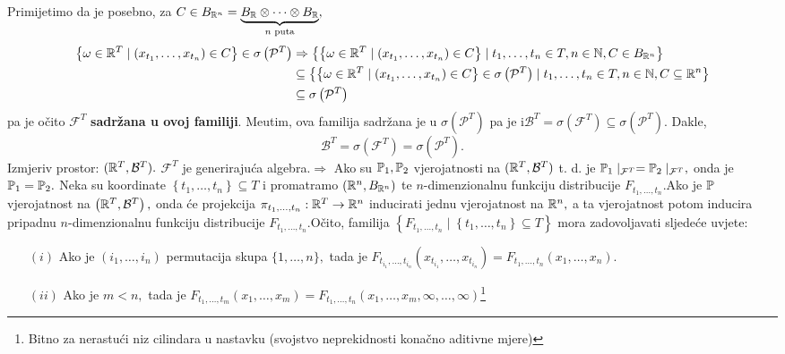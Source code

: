 \documentclass{article}
\begin{document}
Primijetimo da je posebno, za \(C\in B_{\Bbb R^n}=\underbrace{B_{\Bbb R}\otimes\cdots\otimes B_{\Bbb R}}_{n\text{ puta}},\)\[\begin{aligned}\left\{\omega\in\Bbb R^T\mid (x_{t_1},\ldots,x_{t_n})\in C\right\}\in\sigma\left(\mathcal P^T\right)&\Rightarrow\left\{\left\{\omega\in\Bbb R^T\mid(x_{t_1},\ldots,x_{t_n})\in C\right\}\mid t_1,\ldots,t_n\in T,n\in\Bbb N,C\in B_{\Bbb R^n}\right\}\\&\subseteq\left\{\left\{\omega\in\Bbb R^T\mid(x_{t_1},\ldots,x_{t_n})\in C\right\}\in\sigma\left(\mathcal P^T\right)\mid t_1,\ldots,t_n\in T,n\in\Bbb N,C\subseteq\Bbb R^n\right\}\\&\subseteq\sigma\left(\mathcal P^T\right)\end{aligned}\] pa je očito \(\mathcal F^T\) \textbf{sadržana u ovoj familiji}. Me\dj{}utim, ova familija sadržana je u \(\sigma(\mathcal P^T)\) pa je i\newline \(\mathcal B^T=\sigma\left(\mathcal F^T\right)\subseteq\sigma\left(\mathcal P^T\right).\) Dakle, \[\mathcal B^T=\sigma\left(\mathcal F^T\right)=\sigma\left(\mathcal P^T\right).\]
Izmjeriv prostor: \((\Bbb R^T,\mathcal B^T).\) \(\mathcal F^T\) je generirajuća algebra.\newline \(\Rightarrow\) Ako su \(\Bbb P_1,\Bbb P_2\) vjerojatnosti na \((\Bbb R^T,\mathcal B^T)\) t. d. je \(\Bbb P_1\mid_{\mathcal F^T}=\Bbb P_2\mid_{\mathcal F^T},\) onda je \(\Bbb P_1=\Bbb P_2.\)\newline\newline
Neka su koordinate \(\left\{t_1,\ldots,t_n\right\}\subseteq T\) i promatramo \(\left(\Bbb R^n,B_{\Bbb R^n}\right)\) te \(n\)-dimenzionalnu funkciju distribucije \(F_{t_1,\ldots,t_n}.\)\newline\newline Ako je \(\Bbb P\) vjerojatnost na \(\left(\Bbb R^T,\mathcal B^T\right),\) onda će projekcija \(\pi_{t_1,\ldots,t_n}:\Bbb R^T\to\Bbb R^n\) inducirati jednu vjerojatnost na \(\Bbb R^n,\) a ta vjerojatnost potom inducira pripadnu \(n\)-dimenzionalnu funkciju distribucije \(F_{t_1,\ldots,t_n}.\)\newline Očito, familija \(\left\{F_{t_1,\ldots,t_n}\mid \left\{t_1,\ldots,t_n\right\}\subseteq T\right\}\) mora zadovoljavati sljedeće uvjete:
\begin{enumerate}
    \item[\((i)\)] Ako je \((i_1,\ldots,i_n)\) permutacija skupa \(\{1,\ldots,n\},\) tada je \(F_{t_{i_1},\ldots,t_{i_n}}\left(x_{t_{i_1}},\ldots,x_{t_{i_n}}\right)=F_{t_1,\ldots,t_n}(x_1,\ldots,x_n).\)
    \item[\((ii)\)] Ako je \(m<n,\) tada je \(F_{t_1,\ldots,t_m}(x_1,\ldots,x_m)=F_{t_1,\ldots,t_n}(x_1,\ldots,x_m,\infty,\ldots,\infty)\)\footnote[7]{Bitno za nerastući niz cilindara u nastavku (svojstvo neprekidnosti konačno aditivne mjere)}
\end{enumerate}
\end{document}

